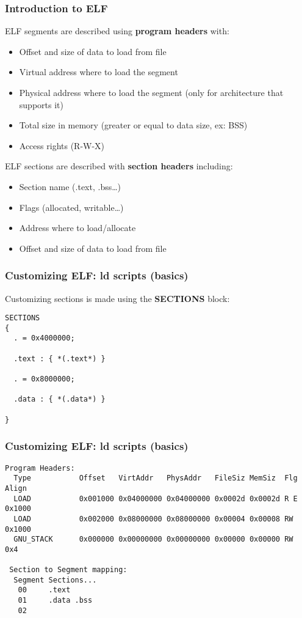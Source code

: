 \begin{frame}
  \frametitle{Introduction to ELF}

  ELF segments are described using \textbf{program headers} with:

  \begin{itemize}
  \item
    Offset and size of data to load from file
  \item
    Virtual address where to load the segment
  \item
    Physical address where to load the segment (only for architecture
    that supports it)
  \item
    Total size in memory (greater or equal to data size, ex: BSS)
  \item
    Access rights (R-W-X)
  \end{itemize}

  \-

  ELF sections are described with \textbf{section headers} including:

  \begin{itemize}
  \item
    Section name (.text, .bss\ldots)
  \item
    Flags (allocated, writable\ldots)
  \item
    Address where to load/allocate
  \item
    Offset and size of data to load from file
  \end{itemize}

\end{frame}


\begin{frame}[containsverbatim]
  \frametitle{Customizing ELF: ld scripts (basics)}

  Customizing sections is made using the \textbf{SECTIONS} block:

  \begin{verbatim}
SECTIONS
{
  . = 0x4000000;

  .text : { *(.text*) }

  . = 0x8000000;

  .data : { *(.data*) }

}
  \end{verbatim}

\end{frame}


\begin{frame}[containsverbatim]
  \frametitle{Customizing ELF: ld scripts (basics)}

  \begin{verbatim}
Program Headers:
  Type           Offset   VirtAddr   PhysAddr   FileSiz MemSiz  Flg Align
  LOAD           0x001000 0x04000000 0x04000000 0x0002d 0x0002d R E 0x1000
  LOAD           0x002000 0x08000000 0x08000000 0x00004 0x00008 RW  0x1000
  GNU_STACK      0x000000 0x00000000 0x00000000 0x00000 0x00000 RW  0x4

 Section to Segment mapping:
  Segment Sections...
   00     .text
   01     .data .bss
   02
  \end{verbatim}

\end{frame}

